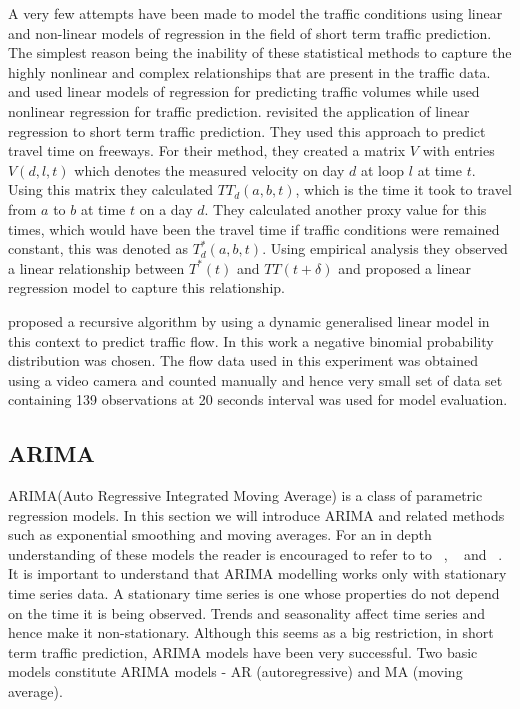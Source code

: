 A very few attempts have been made to model the traffic conditions using linear and non-linear
models of regression in the field of short term traffic prediction. The simplest reason being the
inability of these statistical methods to capture the highly nonlinear and complex relationships that
are present in the traffic data. \citet{low1972new} and \citet{jensen1973calibrating}
used linear models of regression for predicting traffic volumes while \citet{hogberg1976estimation}
used nonlinear regression for traffic prediction. \citet{rice2004simple} revisited the application of
linear regression to short term traffic prediction. They used this approach to predict travel time
on freeways. For their method, they created a matrix $V$ with entries $V(d,l,t)$ which denotes the
measured velocity on day $d$ at loop $l$ at time $t$. Using this matrix they calculated $TT_{d}(a,b,t)$,
which is the time it took to travel from $a$ to $b$ at time $t$ on a day $d$. They calculated another
proxy value for this times, which would have been the travel time if traffic conditions were remained
constant, this was denoted as $T^*_{d}(a,b,t)$. Using empirical analysis they observed a linear
relationship between $T^*(t)$ and $TT(t+\delta)$ and proposed a linear regression model to capture this
relationship.

\citet{lan1999real} proposed a recursive algorithm by using a dynamic generalised linear model
in this context to predict traffic flow. In this work a negative binomial probability distribution
was chosen. The flow data used in this experiment was obtained using a video camera and counted
manually and hence very small set of data set containing 139 observations at 20 seconds interval
was used for model evaluation.

\subsection{ARIMA}
ARIMA(Auto Regressive Integrated Moving Average) is a class of parametric regression models. In
this section we will introduce ARIMA and related methods such as exponential smoothing and moving
averages. For an in depth understanding of these models the reader is encouraged to refer to to
~\citet{tong1990non}, ~\citet{brockwell2006introduction} and ~\citet{box2015time}. It is
important to understand that ARIMA modelling works only with stationary time series data. A
stationary time series is one whose properties do not depend on the time it is being observed.
Trends and seasonality affect time series and hence make it non-stationary. Although this seems as a
big restriction, in short term traffic prediction, ARIMA models have been very successful. Two
basic models constitute ARIMA models - AR (autoregressive) and MA (moving average).

